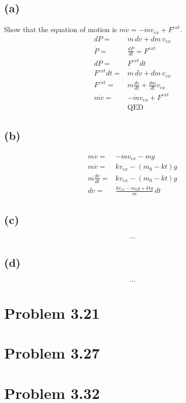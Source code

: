 \documentclass[12pt, a4paper]{article}
\begin{document}
\subsection*{(a)}
Show that the equation of motion is $m\dot{v} = -\dot{m}v_{ex} + F^{ext}$.
\begin{align*}
dP =& m \,dv + dm \, v_{ex}
\\
\dot{P} =& \frac{dP}{dt} = F^{ext}
\\
dP =& F^{ext}dt
\\
F^{ext}dt =& m \,dv + dm \, v_{ex}
\\
F^{ext} =& m \frac{dv}{dt} + \frac{dm}{dt} v_{ex}
\\
m\dot{v} =& -\dot{m}v_{ex} + F^{ext}
\\
&\text{QED}
\end{align*}
\subsection*{(b)}
\begin{align*}
m\dot{v} =& -\dot{m}v_{ex} - mg
\\
m\dot{v} =& kv_{ex} - (m_0-kt)g
\\
m\frac{dv}{dt} =& kv_{ex} - (m_0-kt)g
\\
dv =& \frac{kv_{ex} - m_0g + ktg}{m} \, dt
\end{align*}
\subsection*{(c)}
\begin{align*}
...
\end{align*}
\subsection*{(d)}
\begin{align*}
...
\end{align*}



\pagebreak
\section*{Problem 3.21}




\pagebreak
\section*{Problem 3.27}




\pagebreak
\section*{Problem 3.32}
\end{document}
